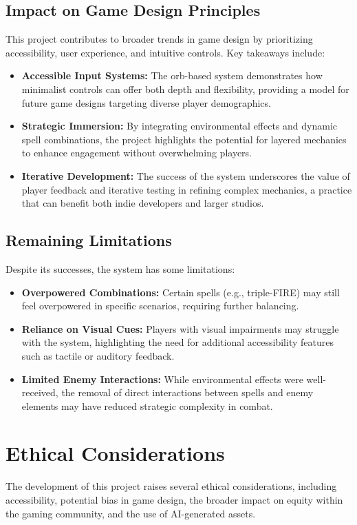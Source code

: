 \documentclass[10pt,twocolumn]{article}
\begin{document}
\subsection{Impact on Game Design Principles} This project contributes to broader trends in game design by prioritizing accessibility, user experience, and intuitive controls. Key takeaways include: 
\begin{itemize} 
    \item \textbf{Accessible Input Systems:} The orb-based system demonstrates how minimalist controls can offer both depth and flexibility, providing a model for future game designs targeting diverse player demographics. 
    \item \textbf{Strategic Immersion:} By integrating environmental effects and dynamic spell combinations, the project highlights the potential for layered mechanics to enhance engagement without overwhelming players. 
    \item \textbf{Iterative Development:} The success of the system underscores the value of player feedback and iterative testing in refining complex mechanics, a practice that can benefit both indie developers and larger studios. 
\end{itemize}

\subsection{Remaining Limitations} Despite its successes, the system has some limitations: 
\begin{itemize} 
    \item \textbf{Overpowered Combinations:} Certain spells (e.g., triple-FIRE) may still feel overpowered in specific scenarios, requiring further balancing. 
    \item \textbf{Reliance on Visual Cues:} Players with visual impairments may struggle with the system, highlighting the need for additional accessibility features such as tactile or auditory feedback. 
    \item \textbf{Limited Enemy Interactions:} While environmental effects were well-received, the removal of direct interactions between spells and enemy elements may have reduced strategic complexity in combat. \end{itemize}

\section{Ethical Considerations}
The development of this project raises several ethical considerations, including accessibility, potential bias in game design, the broader impact on equity within the gaming community, and the use of AI-generated assets.
\end{document}
